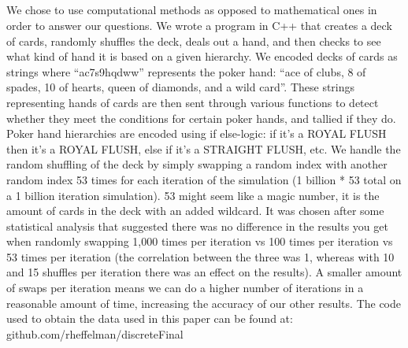 \documentclass[16pt]{article}
\begin{document}
\subsection{}
We chose to use computational methods as opposed to mathematical ones in order to answer our questions. We wrote a program in C++ that creates a deck of cards, randomly shuffles the deck, deals out a hand, and then checks to see what kind of hand it is based on a given hierarchy. We encoded decks of cards as strings where ``ac7s9hqdww'' represents the poker hand: ``ace of clubs, 8 of spades, 10 of hearts, queen of diamonds, and a wild card''. These strings representing hands of cards are then sent through various functions to detect whether they meet the conditions for certain poker hands, and tallied if they do. Poker hand hierarchies are encoded using if else-logic: if it’s a ROYAL FLUSH then it’s a ROYAL FLUSH, else if it’s a STRAIGHT FLUSH, etc. We handle the random shuffling of the deck by simply swapping a random index with another random index 53 times for each iteration of the simulation (1 billion * 53 total on a 1 billion iteration simulation). 53 might seem like a magic number, it is the amount of cards in the deck with an added wildcard. It was chosen after some statistical analysis that suggested there was no difference in the results you get when randomly swapping 1,000 times per iteration vs 100 times per iteration vs 53 times per iteration (the correlation between the three was 1, whereas with 10 and 15 shuffles per iteration there was an effect on the results). A smaller amount of swaps per iteration means we can do a higher number of iterations in a reasonable amount of time, increasing the accuracy of our other results. The code used to obtain the data used in this paper can be found at: \\github.com/rheffelman/discreteFinal
\end{document}
